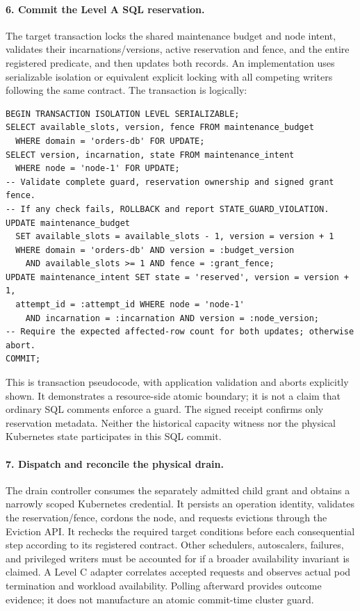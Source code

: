 \paragraph{6. Commit the Level A SQL reservation.}
The target transaction locks the shared maintenance budget and node intent, validates their incarnations/versions, active reservation and fence, and the entire registered predicate, and then updates both records. An implementation uses serializable isolation or equivalent explicit locking with all competing writers following the same contract. The transaction is logically:
\begin{lstlisting}
BEGIN TRANSACTION ISOLATION LEVEL SERIALIZABLE;
SELECT available_slots, version, fence FROM maintenance_budget
  WHERE domain = 'orders-db' FOR UPDATE;
SELECT version, incarnation, state FROM maintenance_intent
  WHERE node = 'node-1' FOR UPDATE;
-- Validate complete guard, reservation ownership and signed grant fence.
-- If any check fails, ROLLBACK and report STATE_GUARD_VIOLATION.
UPDATE maintenance_budget
  SET available_slots = available_slots - 1, version = version + 1
  WHERE domain = 'orders-db' AND version = :budget_version
    AND available_slots >= 1 AND fence = :grant_fence;
UPDATE maintenance_intent SET state = 'reserved', version = version + 1,
  attempt_id = :attempt_id WHERE node = 'node-1'
    AND incarnation = :incarnation AND version = :node_version;
-- Require the expected affected-row count for both updates; otherwise abort.
COMMIT;
\end{lstlisting}
This is transaction pseudocode, with application validation and aborts explicitly shown. It demonstrates a resource-side atomic boundary; it is not a claim that ordinary SQL comments enforce a guard. The signed receipt confirms only reservation metadata. Neither the historical capacity witness nor the physical Kubernetes state participates in this SQL commit.

\paragraph{7. Dispatch and reconcile the physical drain.}
The drain controller consumes the separately admitted child grant and obtains a narrowly scoped Kubernetes credential. It persists an operation identity, validates the reservation/fence, cordons the node, and requests evictions through the Eviction API. It rechecks the required target conditions before each consequential step according to its registered contract. Other schedulers, autoscalers, failures, and privileged writers must be accounted for if a broader availability invariant is claimed. A Level C adapter correlates accepted requests and observes actual pod termination and workload availability. Polling afterward provides outcome evidence; it does not manufacture an atomic commit-time cluster guard.

